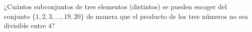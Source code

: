 ¿Cuántos subconjuntos de tres elementos (distintos) se pueden escoger del conjunto $\{1,2,3,\dots,19,20\}$ de manera que el producto de los tres números no sea divisible entre $4$?